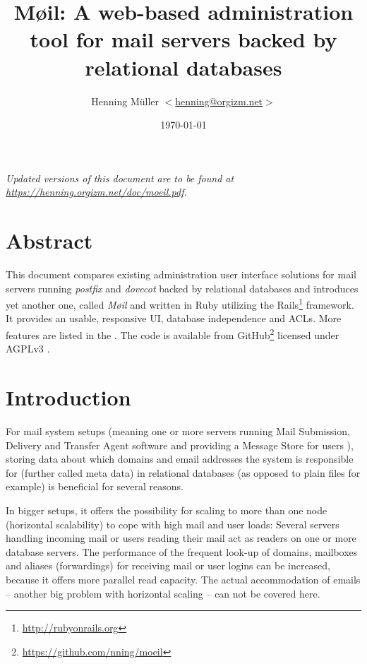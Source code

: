 \documentclass[12pt,a4paper]{scrartcl}
\begin{document}
	\title{Møil: A web-based administration tool for mail servers backed by relational databases}
	\author{Henning Müller $<$\href{mailto:henning@orgizm.net}{henning@orgizm.net}$>$}
	\date{\today}

	\maketitle

	\begin{center}
		\textit{Updated versions of this document are to be found at \\
			\url{https://henning.orgizm.net/doc/moeil.pdf}.}
	\end{center}

	\tableofcontents

	\section{Abstract}
		This document compares existing administration user interface solutions
		for mail servers running \emph{postfix} and \emph{dovecot} backed by
		relational databases and introduces yet another one, called \emph{Møil}
		and written in Ruby utilizing the
		\ac{Rails}\footnote{\url{http://rubyonrails.org}} framework. It
		provides an usable, responsive \ac{UI}, database independence and ACLs.
		More features are listed in the . The
		code is available from
		GitHub\footnote{\url{https://github.com/nning/moeil}} licensed under
		AGPLv3 \cite{agpl}.

	\section{Introduction}

		For mail system setups (meaning one or more servers running Mail
		Submission, Delivery and Transfer Agent software and providing a
		Message Store for users \cite{mail-architecture}), storing data about
		which domains and email addresses the system is responsible for
		(further called meta data) in relational databases (as opposed to plain
		files for example) is beneficial for several reasons.


		In bigger setups, it offers the possibility for scaling to more than
		one node (horizontal scalability) to cope with high mail and user
		loads: Several servers handling incoming mail or users reading their
		mail act as readers on one or more database servers. The performance of
		the frequent look-up of domains, mailboxes and aliases (forwardings)
		for receiving mail or user logins can be increased, because it offers
		more parallel read capacity. The actual accommodation of emails --
		another big problem with horizontal scaling	-- can not be covered
		here.
\end{document}
